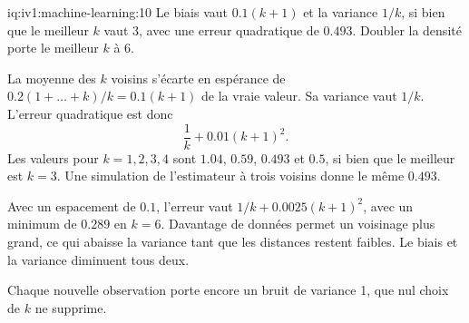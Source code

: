 \begin{solution}{iq:iv1:machine-learning:10}
Le biais vaut $0.1(k + 1)$ et la variance $1/k$, si bien que le meilleur $k$ vaut 3, avec une erreur quadratique de $0.493$. Doubler la densité porte le meilleur $k$ à 6.

La moyenne des $k$ voisins s'écarte en espérance de $0.2(1 + \dots + k)/k = 0.1(k + 1)$ de la vraie valeur. Sa variance vaut $1/k$. L'erreur quadratique est donc
\[
\frac{1}{k} + 0.01(k + 1)^2.
\]
Les valeurs pour $k = 1, 2, 3, 4$ sont $1.04$, $0.59$, $0.493$ et $0.5$, si bien que le meilleur est $k = 3$. Une simulation de l'estimateur à trois voisins donne le même $0.493$.

Avec un espacement de $0.1$, l'erreur vaut $1/k + 0.0025(k + 1)^2$, avec un minimum de $0.289$ en $k = 6$. Davantage de données permet un voisinage plus grand, ce qui abaisse la variance tant que les distances restent faibles. Le biais et la variance diminuent tous deux.

Chaque nouvelle observation porte encore un bruit de variance 1, que nul choix de $k$ ne supprime.



\end{solution}

